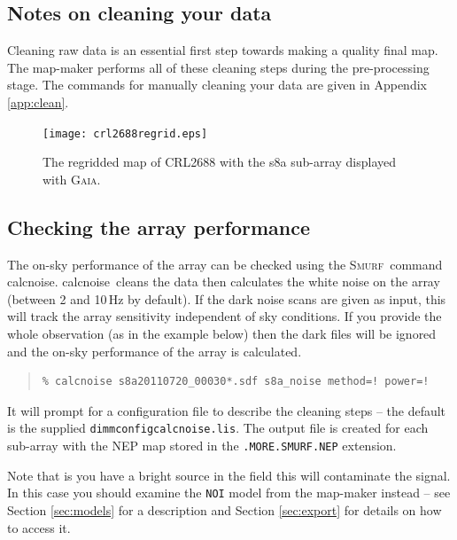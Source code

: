 \documentclass[twoside,11pt]{article}
\newcommand{\xref}[3]{#1}
\newcommand{\xlabel}[1]{}
\renewcommand{\_}{\texttt{\symbol{95}}}
\newenvironment{myquote}{\begin{quote}\begin{small}}{\end{small}\end{quote}}
\newcommand{\gaia}{\xref{\textsc{Gaia}}{sun214}{}}
\newcommand{\smurf}{\xref{\textsc{Smurf}}{sun258}{}}
\newcommand{\task}[1]{\textsf{#1}}
\newcommand{\calcnoise}{\xref{\task{calcnoise}}{sun258}{CALCNOISE}}
\begin{document}
\subsection{\xlabel{clean}Notes on cleaning your data}
\label{sec:clean}
Cleaning raw data is an essential first step towards making a quality final map. The map-maker performs all of these cleaning steps during the pre-processing stage. The commands for manually cleaning your data are given in Appendix \ref{app:clean}.

\begin{figure}[b!]
\begin{center}
\texttt{[image: crl2688\_regrid.eps]}
\caption{\small The regridded map of CRL2688 with the s8a sub-array displayed with \gaia.}
\label{fig:regrid}
\end{center}
\end{figure}


\subsection{\xlabel{calcnoise}Checking the array performance}
\label{sec:calcnoise}
The on-sky performance of the array can be checked using the \smurf\ command \calcnoise. \calcnoise\ cleans the data then calculates the white noise on the array (between 2 and 10\,Hz by default). If the dark noise scans are given as input, this will track the array sensitivity independent of sky conditions. If you provide the whole observation (as in the example below) then the dark files will be ignored and the on-sky performance of the array is calculated. 

\begin{myquote}
\begin{verbatim}
% calcnoise s8a20110720_00030*.sdf s8a_noise method=! power=!
\end{verbatim}
\end{myquote}
It will prompt for a configuration file to describe the cleaning steps -- the default is the supplied \texttt{dimmconfig\_calcnoise.lis}. The output file is created for each sub-array with the NEP map stored in the \texttt{.MORE.SMURF.NEP} extension.

Note that is you have a bright source in the field this will contaminate the signal. In this case you should examine the \texttt{NOI} model from the map-maker instead  -- see Section \ref{sec:models} for a description and Section \ref{sec:export} for details on how to access it.
\raggedbottom

\clearpage
\end{document}
